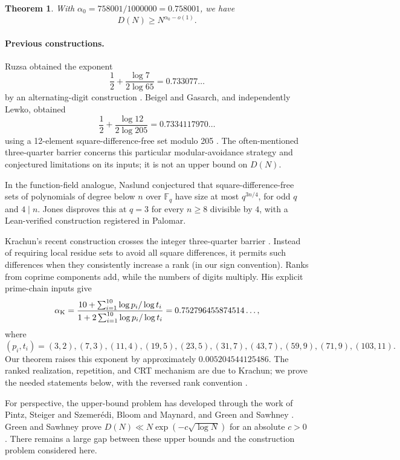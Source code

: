 \documentclass[11pt]{article}
\newtheorem{theorem}{Theorem}[section]
\theoremstyle{definition}
\theoremstyle{remark}
\newcommand{\al}{\alpha_0}
\begin{document}
\begin{theorem}\label{thm:main}
With $\al=758001/1000000=0.758001$, we have
\[
 D(N)\ge N^{\al-o(1)}.
\]
\end{theorem}

\paragraph{Previous constructions.}
Ruzsa obtained the exponent
\[
 \frac12+\frac{\log7}{2\log65}=0.733077\ldots
\]
by an alternating-digit construction \cite{Ruzsa1984}.
Beigel and Gasarch, and independently Lewko, obtained
\[
 \frac12+\frac{\log12}{2\log205}=0.7334117970\ldots
\]
using a 12-element square-difference-free set modulo 205
\cite{BeigelGasarch2008,Lewko2015}.
The often-mentioned three-quarter barrier concerns this particular
modular-avoidance strategy and conjectured limitations on its inputs;
it is not an upper bound on $D(N)$.

In the function-field analogue, Naslund \cite[Conjecture~13]{Naslund2022}
conjectured that square-difference-free sets of polynomials of degree below
$n$ over $\mathbb F_q$ have size at most $q^{3n/4}$, for odd $q$ and $4\mid n$.
Jones \cite{JonesPalomar2026} disproves this at $q=3$ for every $n\ge8$
divisible by $4$, with a Lean-verified construction registered in Palomar.

Krachun's recent construction crosses the integer three-quarter barrier
\cite{Krachun2026}. Instead of requiring local residue sets to avoid all
square differences, it permits such differences when they consistently
increase a rank (in our sign convention). Ranks from coprime components add, while the numbers of
digits multiply. His explicit prime-chain inputs give
\begin{equation}\label{eq:krachun}
 \alpha_{\rm K}=
 \frac{10+\sum_{i=1}^{10}\log p_i/\log t_i}
      {1+2\sum_{i=1}^{10}\log p_i/\log t_i}
 =0.752796455874514\ldots,
\end{equation}
where
\[
 (p_i,t_i)=(3,2),(7,3),(11,4),(19,5),(23,5),
 (31,7),(43,7),(59,9),(71,9),(103,11).
\]
Our theorem raises this exponent by approximately $0.005204544125486$.
The ranked realization, repetition, and CRT mechanism are due to Krachun;
we prove the needed statements below, with the reversed rank convention
\cite[Lemmas 4--5]{Krachun2026}.

For perspective, the upper-bound problem has developed through the work of
Pintz, Steiger and Szemer\'edi, Bloom and Maynard, and Green and Sawhney
\cite{PintzSteigerSzemeredi1988,BloomMaynard2022,GreenSawhney2025}.
Green and Sawhney prove $D(N)\ll N\exp(-c\sqrt{\log N})$ for an absolute
$c>0$ \cite[Theorem 1.1]{GreenSawhney2025}. There remains a large gap
between these upper bounds and the construction problem considered here.
\end{document}
